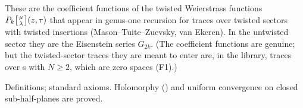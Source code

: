 \begin{physics}
These are the coefficient functions of the twisted Weierstrass functions $P_k\bigl[{\mu\atop\lambda}\bigr](z,\tau)$
that appear in genus-one recursion for traces over twisted sectors with twisted insertions (Mason--Tuite--Zuevsky,
van Ekeren). In the untwisted sector they are the Eisenstein series $G_{2k}$. (The coefficient
functions are genuine; but the twisted-sector traces they are meant to enter are, in the library,
traces over s with $N\ge2$, which are zero spaces (F1).)
\end{physics}
\begin{status}
Definitions; standard axioms. Holomorphy () and uniform convergence
on closed sub-half-planes are proved.
\end{status}

